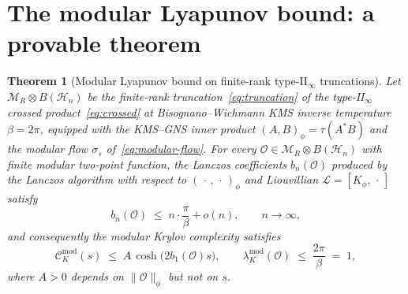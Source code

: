 \documentclass[12pt,a4paper]{article}
\newtheorem{theorem}{Theorem}
\begin{document}
\section{The modular Lyapunov bound: a provable theorem}
\label{sec:bound}

\begin{theorem}[Modular Lyapunov bound on finite-rank type-II$_\infty$
truncations]\label{thm:bound}
Let $\mathcal{M}_R \otimes B(\mathcal{H}_n)$ be the finite-rank
truncation~\eqref{eq:truncation} of the type-II$_\infty$ crossed
product~\eqref{eq:crossed} at Bisognano--Wichmann KMS inverse
temperature $\beta = 2\pi$, equipped with the KMS--GNS inner product
$(A,B)_\phi = \tau(A^* B)$ and the modular flow $\sigma_s$
of~\eqref{eq:modular-flow}.
For every $\mathcal{O} \in \mathcal{M}_R \otimes B(\mathcal{H}_n)$
with finite modular two-point function, the Lanczos coefficients
$b_n(\mathcal{O})$ produced by the Lanczos algorithm with respect
to $(\,\cdot\,,\,\cdot\,)_\phi$ and Liouvillian
$\mathcal{L} = [K_\phi,\,\cdot\,]$ satisfy
\begin{equation}
  b_n(\mathcal{O}) \;\le\; n\cdot\frac{\pi}{\beta} + o(n),
  \qquad n\to\infty,
  \label{eq:bn-bound}
\end{equation}
and consequently the modular Krylov complexity satisfies
\begin{equation}
  \mathcal{C}_K^{\mathrm{mod}}(s)
  \;\le\;
  A\,\cosh\!\bigl(2 b_1(\mathcal{O}) s\bigr),
  \qquad
  \lambda_K^{\mathrm{mod}}(\mathcal{O})
  \;\le\; \frac{2\pi}{\beta} \;=\; 1,
  \label{eq:bound-main}
\end{equation}
where $A>0$ depends on $\|\mathcal{O}\|_\phi$ but not on $s$.
\end{theorem}
\end{document}
